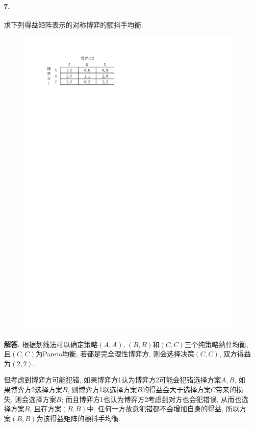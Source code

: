 \documentclass[12pt, a4paper, oneside]{ctexart}
\newenvironment{solution}{\par\noindent\textbf{解答. }}{\bigskip\par}
\begin{document}
\paragraph{7.}求下列得益矩阵表示的对称博弈的颤抖手均衡.
\begin{figure}[htbp]
    \centering
    \includegraphics[scale=1]{经济博弈论3.7.pdf}
\end{figure}
\begin{solution}
    根据划线法可以确定策略$(A,A)$, $(B,B)$和$(C,C)$三个纯策略纳什均衡, 且$(C, C)$为Pareto均衡, 若都是完全理性博弈方, 则会选择决策$(C, C)$, 双方得益为$(2, 2)$.

    但考虑到博弈方可能犯错, 如果博弈方1认为博弈方2可能会犯错选择方案$A, B$, 如果博弈方2选择方案$B$, 则博弈方1以选择方案$B$的得益会大于选择方案$C$带来的损失, 则会选择方案$B$; 而且博弈方1也认为博弈方2考虑到对方也会犯错误, 从而也选择方案$B$, 且在方案$(B,B)$中, 任何一方故意犯错都不会增加自身的得益, 所以方案$(B,B)$为该得益矩阵的颤抖手均衡.
\end{solution}
\end{document}
